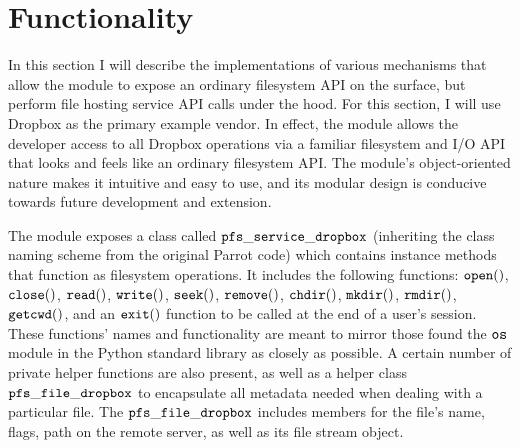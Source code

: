 \documentclass[pageno]{jpaper}
\begin{document}
\section{Functionality}
\label{sec:functionality}
In this section I will describe the implementations of various mechanisms that allow the module to expose an ordinary filesystem API on the surface, but perform file hosting service API calls under the hood. For this section, I will use Dropbox as the primary example vendor. In effect, the module allows the developer access to all Dropbox operations via a familiar filesystem and I/O API that looks and feels like an ordinary filesystem API. The module's object-oriented nature makes it intuitive and easy to use, and its modular design is conducive towards future development and extension.

The module exposes a class called $\tt{pfs\_service\_dropbox}$ (inheriting the class naming scheme from the original Parrot code) which contains instance methods that function as filesystem operations. It includes the following functions: $\tt{open()}$, $\tt{close()}$, $\tt{read()}$, $\tt{write()}$, $\tt{seek()}$, $\tt{remove()}$, $\tt{chdir()}$, $\tt{mkdir()}$, $\tt{rmdir()}$, $\tt{getcwd()}$, and an $\tt{exit()}$ function to be called at the end of a user's session. These functions' names and functionality are meant to mirror those found the $\tt{os}$ module in the Python standard library \cite{os} as closely as possible. A certain number of private helper functions are also present, as well as a helper class $\tt{pfs\_file\_dropbox}$ to encapsulate all metadata needed when dealing with a particular file. The $\tt{pfs\_file\_dropbox}$ includes members for the file's name, flags, path on the remote server, as well as its file stream object.
\end{document}
